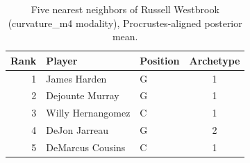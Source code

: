 \begin{table}[htbp]
  \centering\small
  \begin{tabular}{rllc}
    \toprule
    Rank & Player & Position & Archetype \\
    \midrule
    1 & James Harden & G & 1 \\
    2 & Dejounte Murray & G & 1 \\
    3 & Willy Hernangomez & C & 1 \\
    4 & DeJon Jarreau & G & 2 \\
    5 & DeMarcus Cousins & C & 1 \\
    \bottomrule
  \end{tabular}
  \caption{Five nearest neighbors of Russell Westbrook (curvature_m4 modality), Procrustes-aligned posterior mean.}
  \label{tab:Russell_Westbrook_neighbors_curvature_m4}
\end{table}

